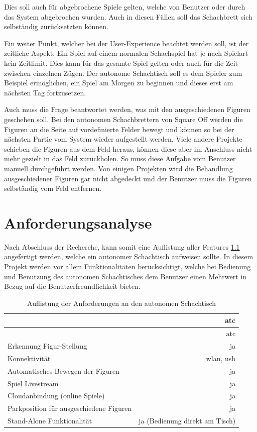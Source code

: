 Dies soll auch für abgebrochene Spiele gelten, welche von Benutzer oder
durch das System abgebrochen wurden. Auch in diesen Fällen soll das
Schachbrett sich selbständig zurücksetzten können.

Ein weiter Punkt, welcher bei der User-Experience beachtet werden soll,
ist der zeitliche Aspekt. Ein Spiel auf einem normalen Schachspiel hat
je nach Spielart kein Zeitlimit. Dies kann für das gesamte Spiel gelten
oder auch für die Zeit zwischen einzelnen Zügen. Der autonome
Schachtisch soll es dem Spieler zum Beispiel ermöglichen, ein Spiel am
Morgen zu beginnen und dieses erst am nächsten Tag fortzusetzen.

Auch muss die Frage beantwortet werden, was mit den ausgeschiedenen
Figuren geschehen soll. Bei den autonomen Schachbrettern von Square
Off\cite{squareoffgrand} werden die Figuren an die Seite auf
vordefinierte Felder bewegt und können so bei der nächsten Partie vom
System wieder aufgestellt werden. Viele andere Projekte schieben die
Figuren aus dem Feld heraus, können diese aber im Anschluss nicht mehr
gezielt in das Feld zurückholen. So muss diese Aufgabe vom Benutzer
manuell durchgeführt werden. Von einigen Projekten wird die Behandlung
ausgeschiedener Figuren gar nicht abgedeckt und der Benutzer muss die
Figuren selbständig vom Feld entfernen.

\hypertarget{anforderungsanalyse}{%
\chapter{Anforderungsanalyse}\label{anforderungsanalyse}}

Nach Abschluss der Recherche, kann somit eine Auflistung aller Features
\ref{atcrequirements} angefertigt werden, welche ein autonomer
Schachtisch aufweisen sollte. In diesem Projekt werden vor allem
Funktionalitäten berücksichtigt, welche bei Bedienung und Benutzung des
autonomen Schachtisches dem Benutzer einen Mehrwert in Bezug auf die
Benutzerfreundlichkeit bieten.

\begin{longtable}[]{@{}lr@{}}
\caption{Auflistung der Anforderungen an den autonomen Schachtisch
\label{atcrequirements}}\tabularnewline
\toprule
& \gls{atc}\tabularnewline
\midrule
\endfirsthead
\toprule
& \gls{atc}\tabularnewline
\midrule
\endhead
Erkennung Figur-Stellung & ja\tabularnewline
Konnektivität & \gls{wlan}, \gls{usb}\tabularnewline
Automatisches Bewegen der Figuren & ja\tabularnewline
Spiel Livestream & ja\tabularnewline
Cloudanbindung (online Spiele) & ja\tabularnewline
Parkposition für ausgeschiedene Figuren & ja\tabularnewline
Stand-Alone Funktionalität & ja (Bedienung direkt am
Tisch)\tabularnewline
\bottomrule
\end{longtable}

